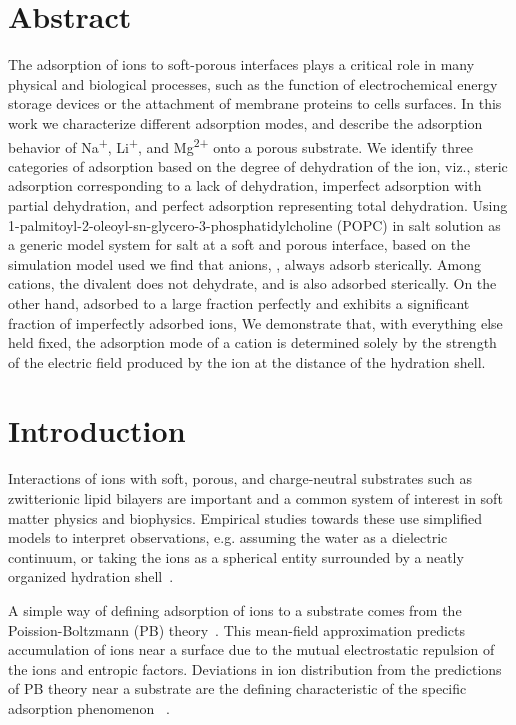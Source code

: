     \section{Abstract}
    The adsorption of ions to soft-porous interfaces plays a critical role in 
    many physical and biological processes, such as the function of electrochemical 
    energy storage devices or 
    the attachment of membrane proteins to cells surfaces. 
    In this work we characterize different adsorption modes, and
    describe the adsorption behavior of Na\textsuperscript{+}, Li\textsuperscript{+}, and Mg\textsuperscript{2+} 
    {onto a porous substrate}.
    We identify three categories of adsorption based on 
    the degree of dehydration of the ion, 
    viz., steric adsorption {corresponding to a lack of dehydration}, 
    imperfect adsorption {with partial dehydration}, and 
    perfect adsorption {representing total dehydration}.
    Using 1-palmitoyl-2-oleoyl-sn-glycero-3-phosphatidylcholine (POPC) 
    in salt solution as a generic model system for salt at a soft and 
    porous interface, based on the simulation model used we find that 
    anions, \cl, always adsorb sterically. Among cations, the divalent
    \mg does not dehydrate, and is {also} adsorbed sterically. 
    On the other hand, \na  
    adsorbed to a large fraction perfectly 
    {and \li{} exhibits a significant fraction of imperfectly adsorbed ions,}
    We demonstrate that, with everything else held fixed, the 
    adsorption mode of a cation is determined
    solely by the strength of the electric field produced by the 
    ion at the distance of the hydration shell. 


\section{Introduction}
Interactions of ions with soft, porous, and charge-neutral substrates
such as zwitterionic lipid bilayers are important and a common
system of interest in soft matter physics and biophysics.
Empirical studies towards these use simplified
models to interpret observations, e.g. assuming the water as a
dielectric continuum,
or taking the ions as a spherical entity surrounded
by a neatly organized hydration shell~\cite{israelachvili:2011:intermol}.

A simple way of defining adsorption of ions to a substrate 
comes from the Poission-Boltzmann (PB) theory~\cite{israelachvili:2011:intermol}.
{This mean-field approximation predicts accumulation
of ions near a surface due to the mutual electrostatic repulsion
of the ions and entropic factors.}
{Deviations in ion distribution from the predictions of PB theory near a substrate are
    the defining characteristic of the specific adsorption phenomenon
~\cite{stern:1924:theory,grahame:1947:electrical}.}

